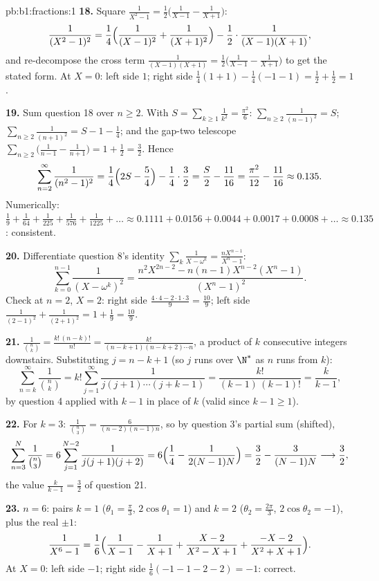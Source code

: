 \begin{solution}{pb:b1:fractions:1}
\textbf{18.} Square $\frac1{X^2-1} = \frac12\bigl(\frac1{X-1} -
\frac1{X+1}\bigr)$:
\[
\frac1{(X^2-1)^2} = \frac14\Bigl(\frac1{(X-1)^2} +
\frac1{(X+1)^2}\Bigr) - \frac12\cdot\frac1{(X-1)(X+1)} ,
\]
and re-decompose the cross term $\frac1{(X-1)(X+1)} =
\frac12\bigl(\frac1{X-1} - \frac1{X+1}\bigr)$ to get the stated
form. At $X = 0$: left side $1$; right side $\frac14(1 + 1) -
\frac14(-1 - 1) = \frac12 + \frac12 = 1$.

\textbf{19.} Sum question 18 over $n \geq 2$. With $S =
\sum_{k\geq1}\frac1{k^2} = \frac{\pi^2}6$: $\sum_{n\geq2}
\frac1{(n-1)^2} = S$; $\sum_{n\geq2}\frac1{(n+1)^2} = S - 1 -
\frac14$; and the gap-two telescope $\sum_{n\geq2}\bigl(
\frac1{n-1} - \frac1{n+1}\bigr) = 1 + \frac12 = \frac32$. Hence
\[
\sum_{n=2}^{\infty}\frac1{(n^2-1)^2}
= \frac14\Bigl(2S - \frac54\Bigr) - \frac14\cdot\frac32
= \frac S2 - \frac{11}{16}
= \frac{\pi^2}{12} - \frac{11}{16} \approx 0.135 .
\]
Numerically: $\frac19 + \frac1{64} + \frac1{225} + \frac1{576} +
\frac1{1225} + \dots \approx 0.1111 + 0.0156 + 0.0044 + 0.0017 +
0.0008 + \dots \approx 0.135$: consistent.

\textbf{20.} Differentiate question 8's identity
$\sum_k\frac1{X-\omega^k} = \frac{nX^{n-1}}{X^n-1}$:
\[
\sum_{k=0}^{n-1}\frac1{(X - \omega^k)^2}
= \frac{n^2X^{2n-2} - n(n-1)X^{n-2}(X^n - 1)}{(X^n - 1)^2} .
\]
Check at $n = 2$, $X = 2$: right side $\frac{4\cdot4 -
2\cdot1\cdot3}{9} = \frac{10}9$; left side $\frac1{(2-1)^2} +
\frac1{(2+1)^2} = 1 + \frac19 = \frac{10}9$.

\textbf{21.} $\frac1{\binom nk} = \frac{k!\,(n-k)!}{n!} =
\frac{k!}{(n-k+1)(n-k+2)\cdots n}$, a product of $k$ consecutive
integers downstairs. Substituting $j = n - k + 1$ (so $j$ runs
over $\N^*$ as $n$ runs from $k$):
\[
\sum_{n=k}^{\infty}\frac1{\binom nk}
= k!\sum_{j=1}^{\infty}\frac1{j(j+1)\cdots(j+k-1)}
= \frac{k!}{(k-1)\,(k-1)!} = \frac{k}{k-1} ,
\]
by question 4 applied with $k - 1$ in place of $k$ (valid since
$k - 1 \geq 1$).

\textbf{22.} For $k = 3$: $\frac1{\binom n3} =
\frac6{(n-2)(n-1)n}$, so by question 3's partial sum (shifted),
\[
\sum_{n=3}^{N}\frac1{\binom n3}
= 6\sum_{j=1}^{N-2}\frac1{j(j+1)(j+2)}
= 6\Bigl(\frac14 - \frac1{2(N-1)N}\Bigr)
= \frac32 - \frac3{(N-1)N}
\longrightarrow \frac32 ,
\]
the value $\frac k{k-1} = \frac32$ of question 21.

\textbf{23.} $n = 6$: pairs $k = 1$ ($\theta_1 = \frac\pi3$,
$2\cos\theta_1 = 1$) and $k = 2$ ($\theta_2 = \frac{2\pi}3$,
$2\cos\theta_2 = -1$), plus the real  $\pm1$:
\[
\frac1{X^6-1} = \frac16\Bigl(\frac1{X-1} - \frac1{X+1}
+ \frac{X - 2}{X^2 - X + 1}
+ \frac{-X - 2}{X^2 + X + 1}\Bigr) .
\]
At $X = 0$: left side $-1$; right side $\frac16(-1 - 1 - 2 - 2)
= -1$: correct.


\end{solution}
